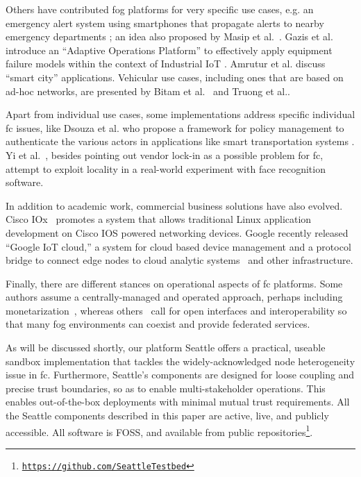 Others have contributed fog platforms for very specific use cases, e.g.
an emergency alert system using smartphones that propagate alerts to nearby
emergency departments \cite{7134091}; an idea also proposed by Masip
et al.~\cite{masip-bruin_foggy_2016}. Gazis et al. introduce an ``Adaptive
Operations Platform''
to effectively apply equipment failure models within the context of Industrial
\gls{IoT} \cite{gazis_components_2015}.
Amrutur et al.\cite{amrutur_open_2017} discuss ``smart city''
applications. Vehicular use cases, including ones that are based on
ad-hoc networks, are presented by Bitam et al.~\cite{bitam_vanet-cloud:_2015}
and Truong et al.\cite{truong_software_2015}.

Apart from individual use cases, some implementations address specific individual
\gls{fc} issues, like Dsouza et al. who propose a framework for
policy management to authenticate the various actors in applications
like smart
transportation systems \cite{dsouza_policy-driven_2014}.
Yi et al.~\cite{yi_fog_2015}, besides pointing out vendor lock-in
as a possible problem for \gls{fc}, attempt to exploit locality
in a real-world experiment with face recognition software.

In addition to academic work, commercial business solutions have also evolved.
Cisco IOx~\cite{cisco_iox} promotes a
system that allows traditional Linux application development on
Cisco IOS powered networking devices.
Google recently released ``Google \gls{IoT} cloud,'' a system for
cloud based device management and a protocol bridge to connect edge nodes to
cloud analytic systems~\cite{google_iot_core} and other infrastructure.

Finally, there are different stances on operational aspects of
\gls{fc} platforms. Some authors assume a centrally-managed and
operated approach, perhaps including monetarization~\cite{mahmud_fog_2016,7868354}, whereas others~\cite{belli_design_2015}
call for open interfaces and interoperability so that many
fog environments can coexist and provide federated services.

As will be discussed shortly, our platform Seattle offers a practical,
useable sandbox implementation that tackles the widely-acknowledged
node heterogeneity issue in \gls{fc}. Furthermore, Seattle's components
are designed for loose coupling and precise trust boundaries, so as to
enable multi-stakeholder operations. This enables out-of-the-box
deployments with minimal mutual trust requirements.
All the Seattle components described in this paper are active, live, and
publicly accessible. All software is
\acrlong{FOSS}, and available from public
repositories\footnote{\texttt{\url{https://github.com/SeattleTestbed}}}.



